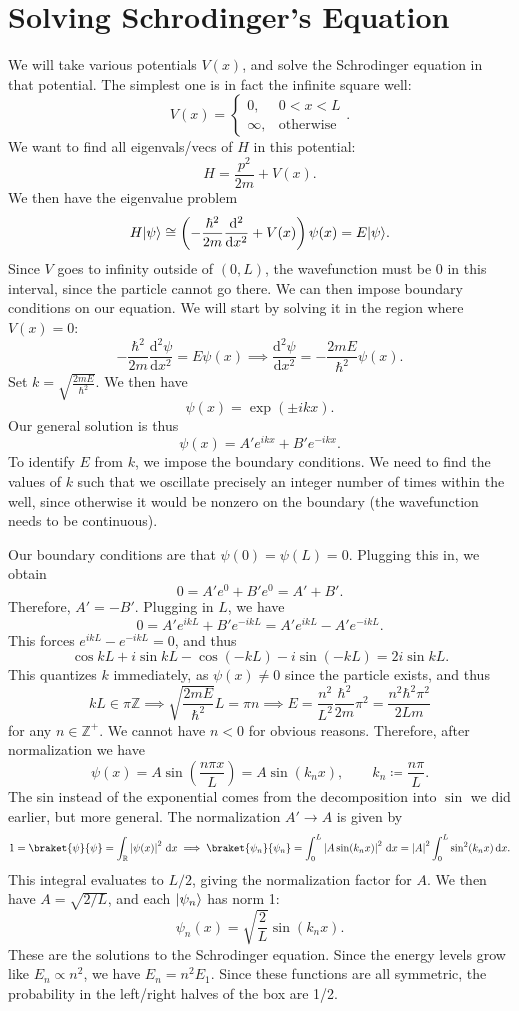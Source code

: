\section{Solving Schrodinger's Equation}
We will take various potentials $V(x)$, and solve the Schrodinger equation in that potential. The simplest one is in fact the infinite square well:
\[
	V(x)=
	\begin{cases}
		0,&0<x<L\\
		\infty ,&\text{otherwise} 
	\end{cases}
.\]
We want to find all eigenvals/vecs of $H$ in this potential:
\[
	H=\frac{p^2}{2m}+ V(x)
.\]
We then have the eigenvalue problem
\[
	H\lvert\psi \rangle \cong \left( -\frac{\hbar ^2}{2m} \frac{\mathrm{d}^2}{\mathrm{d}x^2} +V(x) \right) \psi (x)=E\lvert\psi \rangle 
.\]
Since $V$ goes to infinity outside of $(0,L)$, the wavefunction must be 0 in this interval, since the particle cannot go there. We can then impose boundary conditions on our equation. We will start by solving it in the region where $V(x)=0$:
\[
	-\frac{\hbar ^2}{2m} \frac{\mathrm{d}^2\psi }{\mathrm{d}x^2} =E\psi (x)\implies \frac{\mathrm{d}^2\psi }{\mathrm{d}x^2} =-\frac{2mE}{\hbar ^2} \psi (x)
.\]
Set $k=\sqrt{\frac{2mE}{\hbar ^2} } $. We then have
\[
	\psi (x)=\exp \left( \pm ikx \right) 
.\]
Our general solution is thus
\[
	\psi (x)=A'e^{ikx} +B'e^{-ikx} 
.\]
To identify $E$ from $k$, we impose the boundary conditions. We need to find the values of $k$ such that we oscillate precisely an integer number of times within the well, since otherwise it would be nonzero on the boundary (the wavefunction needs to be continuous).

Our boundary conditions are that $\psi (0)=\psi (L)=0$. Plugging this in, we obtain
\[
	0=A'e^{0} +B'e^{0} =A'+B'
.\]
Therefore, $A'=-B'$. Plugging in $L$, we have
\[
	0=A'e^{ikL} +B'e^{-ikL} =A'e^{ikL} -A'e^{-ikL} 
.\]
This forces $e^{ikL} -e^{-ikL} =0$, and thus
\[
	\cos kL+i \sin kL-\cos (-kL)-i \sin (-kL)=2i \sin kL
.\]
This quantizes $k$ immediately, as $\psi (x)\neq 0$ since the particle exists, and thus
\[
	kL\in \pi\mathbb{Z} \implies \sqrt{\frac{2mE}{\hbar ^2} } L=\pi n\implies E=\frac{n^2}{L^2} \frac{\hbar ^2}{2m}\pi^2 =\frac{n^2\hbar ^2\pi^2 }{2Lm}  
\]
for any $n\in\mathbb{Z}^+ $. We cannot have $n<0$ for obvious reasons. Therefore, after normalization we have
\[
	\psi (x)=A \sin \left( \frac{n\pi x}{L}  \right) =A \sin \left( k_nx \right) ,\qquad k_n\coloneqq \frac{n\pi }{L} 
.\]
The sin instead of the exponential comes from the decomposition into $\sin $ we did earlier, but more general. The normalization $A'\to A$ is given by
\[
	1=\braket{\psi }{\psi } =\int_{\mathbb{R} }  \left| \psi (x) \right| ^2 \,\mathrm{d} x\implies \braket{\psi _n}{\psi _n} =\int_{0}^{L} \left| A \sin (k_nx) \right| ^2 \,\mathrm{d} x=\left| A \right| ^2\int_{0}^{L} \sin ^2(k_nx) \,\mathrm{d} x
.\]
This integral evaluates to $L/2$, giving the normalization factor for $A$. We then have $A=\sqrt{2/L} $, and each $\lvert\psi _n\rangle $ has norm 1:
\[
	\psi _n(x)=\sqrt{\frac{2}{L} } \sin \left( k_nx \right)
.\]
These are the solutions to the Schrodinger equation. Since the energy levels grow like $E_n\propto n^2$, we have $E_n=n^2E_1$. Since these functions are all symmetric, the probability in the left/right halves of the box are 1/2.
